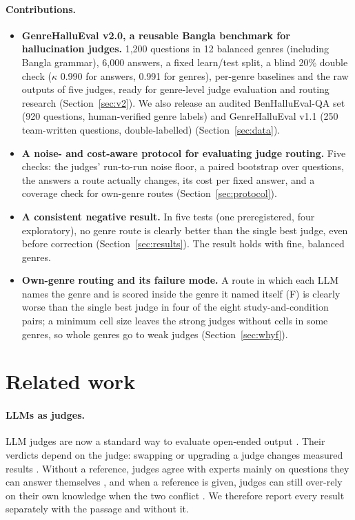 \documentclass[11pt]{article}
\begin{document}
\paragraph{Contributions.}
\begin{itemize}
  \item \textbf{GenreHalluEval v2.0, a reusable Bangla benchmark for hallucination judges.} 1,200 questions in 12
  balanced genres (including Bangla grammar), 6,000 answers, a fixed learn/test split, a blind 20\% double check
  ($\kappa$ 0.990 for answers, 0.991 for genres), per-genre baselines and the raw outputs of five judges, ready for
  genre-level judge evaluation and routing research (Section~\ref{sec:v2}). We also release an audited
  BenHalluEval-QA set (920 questions, human-verified genre labels) and GenreHalluEval v1.1 (250 team-written
  questions, double-labelled) (Section~\ref{sec:data}).
  \item \textbf{A noise- and cost-aware protocol for evaluating judge routing.} Five checks: the judges' run-to-run
  noise floor, a paired bootstrap over questions, the answers a route actually changes, its cost per fixed answer,
  and a coverage check for own-genre routes (Section~\ref{sec:protocol}).
  \item \textbf{A consistent negative result.} In five tests (one preregistered, four exploratory), no genre route
  is clearly better than the single best judge, even before correction (Section~\ref{sec:results}). The result holds
  with fine, balanced genres.
  \item \textbf{Own-genre routing and its failure mode.} A route in which each LLM names the genre and is scored
  inside the genre it named itself (F) is clearly worse than the single best judge in four of the eight
  study-and-condition pairs; a minimum cell size leaves the strong judges without cells in some genres, so whole genres
  go to weak judges (Section~\ref{sec:whyf}).
\end{itemize}

\section{Related work}

\paragraph{LLMs as judges.} LLM judges are now a standard way to evaluate open-ended output \citep{zheng2023judging}.
Their verdicts depend on the judge: swapping or upgrading a judge changes measured results
\citep{judgechanges2026}. Without a reference, judges agree with experts mainly on questions they can answer
themselves \citep{nofreelabels2025}, and when a reference is given, judges can still over-rely on their own knowledge
when the two conflict \citep{judgingreference2026}. We therefore report every result separately with the passage and
without it.
\end{document}
